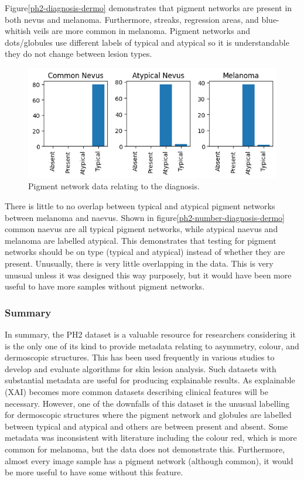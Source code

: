 Figure\ref{ph2-diagnosis-dermo} demonstrates that pigment networks are present in both nevus and melanoma. Furthermore, streaks, regression areas, and blue-whitish veils are more common in melanoma. Pigment networks and dots/globules use different labels of typical and atypical so it is understandable they do not change between lesion types.

\begin{figure}
    \centering
    \includegraphics[scale=0.75]{images/ph2/ph2-pigment-diagnosis.png}
    \caption{Pigment network data relating to the diagnosis.} 
\end{figure}\label{ph2-number-diagnosis-dermo}

There is little to no overlap between typical and atypical pigment networks between melanoma and naevus. Shown in figure\ref{ph2-number-diagnosis-dermo} common naevus are all typical pigment networks, while atypical naevus and melanoma are labelled atypical. This demonstrates that testing for pigment networks should be on type (typical and atypical) instead of whether they are present. Unusually, there is very little overlapping in the data. This is very unusual unless it was designed this way purposely, but it would have been more useful to have more samples without pigment networks.

\subsubsection{Summary}
In summary, the PH2 dataset is a valuable resource for researchers considering it is the only one of its kind to provide metadata relating to asymmetry, colour, and dermoscopic structures. This has been used frequently in various studies to develop and evaluate algorithms for skin lesion analysis. Such datasets with substantial metadata are useful for producing explainable results. As explainable (XAI) becomes more common datasets describing clinical features will be necessary. However, one of the downfalls of this dataset is the unusual labelling for dermoscopic structures where the pigment network and globules are labelled between typical and atypical and others are between present and absent. Some metadata was inconsistent with literature including the colour red, which is more common for melanoma, but the data does not demonstrate this. Furthermore, almost every image sample has a pigment network (although common), it would be more useful to have some without this feature. 


